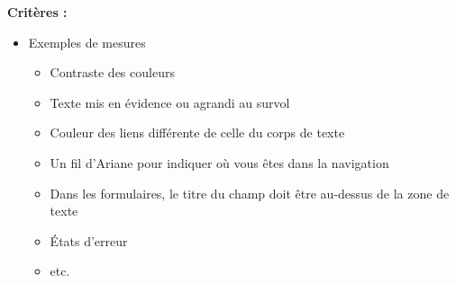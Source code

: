 \textbf{Critères :}

\begin{itemize}
\item Exemples de mesures
\begin{itemize}
\item Contraste des couleurs
\item Texte mis en évidence ou agrandi au survol
\item Couleur des liens différente de celle du corps de texte
\item Un fil d'Ariane pour indiquer où vous êtes dans la navigation
\item Dans les formulaires, le titre du champ doit être au-dessus de la zone de texte
\item États d'erreur
\item etc.
\end{itemize}
\end{itemize}

